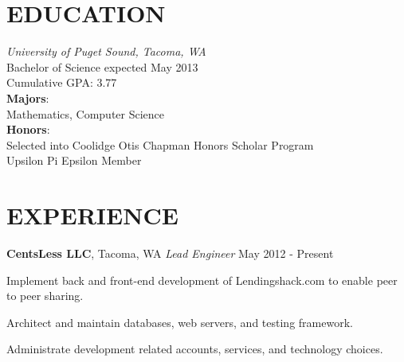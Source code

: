 \documentclass[line,margin]{res}
\newenvironment{itemize*}%
  {\begin{itemize}%
    \setlength{\parsep}{0pt}
    \setlength{\itemsep}{0pt}%
    \setlength{\parskip}{0pt}}%
  {\end{itemize}}
\begin{document}
\address{2214 N. Washington Street, Tacoma, WA 98406} 
\address{kwenholz@pugetsound.edu\hspace*{2mm} \vline \hspace*{2mm} (406)546-9210}

 
\begin{resume}
\vspace*{.3cm}

\section{EDUCATION} {\sl University of Puget Sound, Tacoma, WA} \\
                Bachelor of Science
                expected May 2013 \\
                Cumulative GPA: 3.77\\
                \textbf{Majors}: \\
\hspace*{5mm}                Mathematics, Computer Science \\
                \textbf{Honors}:\\
\hspace*{5mm}   Selected into Coolidge Otis Chapman Honors Scholar Program\\
\hspace*{5mm}   Upsilon Pi Epsilon Member\\

\vspace*{.2cm}

\section{EXPERIENCE} 

\textbf{CentsLess LLC}, Tacoma, WA
{\sl Lead Engineer} \hfill May 2012 - Present
\begin{itemize*}
    \item Implement back and front-end development of Lendingshack.com
        to enable peer to peer sharing.
    \item Architect and maintain databases, web servers, and testing framework.
    \item Administrate development related accounts, services, and technology
        choices.
\end{itemize*}


\end{resume}
\end{document}
